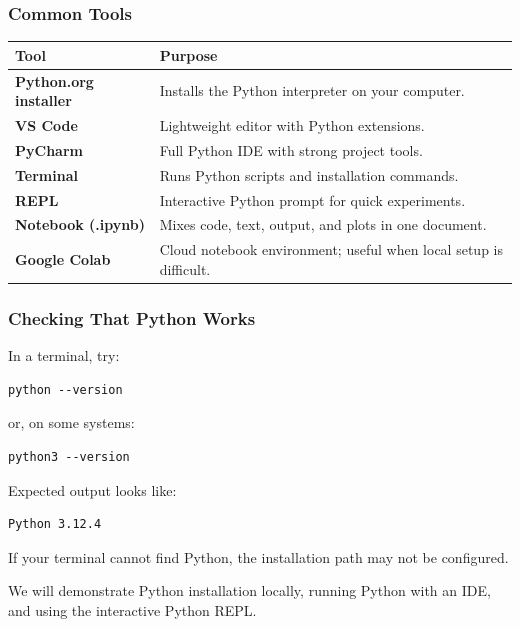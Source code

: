\documentclass[aspectratio=169,10pt]{beamer}
\begin{document}
\begin{frame}
\frametitle{Common Tools}
\vspace{0.45cm}
\renewcommand{\arraystretch}{1.22}
\begin{tabularx}{\textwidth}{>{\bfseries}p{3.8cm}X}
\toprule
Tool & Purpose \\
\midrule
Python.org installer & Installs the Python interpreter on your computer. \\
VS Code & Lightweight editor with Python extensions. \\
PyCharm & Full Python IDE with strong project tools. \\
Terminal & Runs Python scripts and installation commands. \\
REPL & Interactive Python prompt for quick experiments. \\
Notebook (.ipynb) & Mixes code, text, output, and plots in one document. \\
Google Colab & Cloud notebook environment; useful when local setup is difficult. \\
\bottomrule
\end{tabularx}
\end{frame}


\begin{frame}[fragile]
\frametitle{Checking That Python Works}
\vspace{0.06cm}
In a terminal, try:
\begin{lstlisting}[style=termcode,basicstyle=\ttfamily\normalsize,aboveskip=2pt,belowskip=3pt]
python --version
\end{lstlisting}
\vspace{-0.08cm}
or, on some systems:
\begin{lstlisting}[style=termcode,basicstyle=\ttfamily\normalsize,aboveskip=2pt,belowskip=3pt]
python3 --version
\end{lstlisting}
\vspace{-0.08cm}
Expected output looks like:
\begin{lstlisting}[style=termcode,basicstyle=\ttfamily\normalsize,aboveskip=2pt,belowskip=3pt]
Python 3.12.4
\end{lstlisting}
\vspace{-0.08cm}
\begin{tcolorbox}[lecturebox,title=Checkpoint,top=0.5mm,bottom=0.5mm,fontupper=\normalsize]
If your terminal cannot find Python, the installation path may not be configured.
\end{tcolorbox}
\vspace{-0.08cm}
\begin{tcolorbox}[lecturebox,title=Class demonstration,top=0.5mm,bottom=0.5mm,fontupper=\small]
We will demonstrate Python installation locally, running Python with an IDE, and using the interactive Python REPL.
\end{tcolorbox}
\end{frame}
\end{document}
